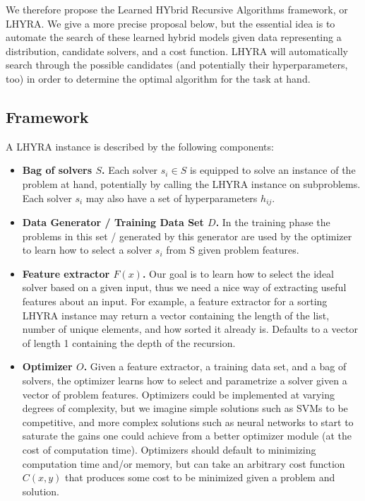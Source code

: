 \documentclass{article}
\begin{document}
We therefore propose the Learned HYbrid Recursive Algorithms framework, or LHYRA. We give a more precise proposal below, but the essential idea is to automate the search of these learned hybrid models given data representing a distribution, candidate solvers, and a cost function. LHYRA will automatically search through the possible candidates (and potentially their hyperparameters, too) in order to determine the optimal algorithm for the task at hand.

\subsection*{Framework}

A LHYRA instance is described by the following components:

\begin{itemize}
	\item \textbf{Bag of solvers $S$.} Each solver $s_i \in S$ is equipped to solve an instance of the problem at hand, potentially by calling the LHYRA instance on subproblems. Each solver $s_i$ may also have a set of hyperparameters $h_{ij}$. 

	\item \textbf{Data Generator / Training Data Set $D$.} In the training phase the problems in this set / generated by this generator are used by the optimizer to learn how to select a solver $s_i$ from S given problem features.

	\item \textbf{Feature extractor $F(x)$.} Our goal is to learn how to select the ideal solver based on a given input, thus we need a nice way of extracting useful features about an input. For example, a feature extractor for a sorting LHYRA instance may return a vector containing the length of the list, number of unique elements, and how sorted it already is. Defaults to a vector of length 1 containing the depth of the recursion.

	\item \textbf{Optimizer $O$.} Given a feature extractor, a training data set, and a bag of solvers, the optimizer learns how to select and parametrize a solver given a vector of problem features.  Optimizers could be implemented at varying degrees of complexity, but we imagine simple solutions such as SVMs to be competitive, and more complex solutions such as neural networks to start to saturate the gains one could achieve from a better optimizer module (at the cost of computation time). Optimizers should default to minimizing computation time and/or memory, but can take an arbitrary cost function $C(x,y)$ that produces some cost to be minimized given a problem and solution. 
\end{itemize}
\end{document}
